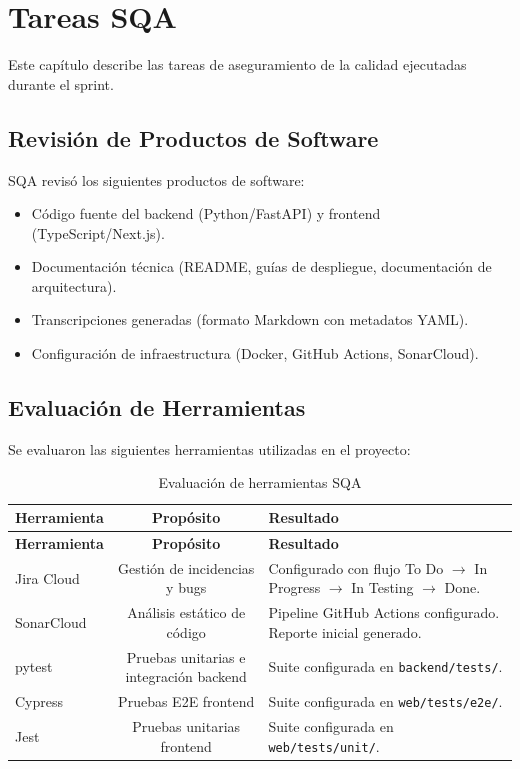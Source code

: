 \chapter{Tareas SQA}
\label{sec:tareas}

Este capítulo describe las tareas de aseguramiento de la calidad ejecutadas durante el sprint.

\section{Revisión de Productos de Software}
\label{sec:revision-productos}

SQA revisó los siguientes productos de software:

\begin{itemize}
    \item Código fuente del backend (Python/FastAPI) y frontend (TypeScript/Next.js).
    \item Documentación técnica (README, guías de despliegue, documentación de arquitectura).
    \item Transcripciones generadas (formato Markdown con metadatos YAML).
    \item Configuración de infraestructura (Docker, GitHub Actions, SonarCloud).
\end{itemize}

\section{Evaluación de Herramientas}
\label{sec:evaluacion-herramientas}

Se evaluaron las siguientes herramientas utilizadas en el proyecto:

\begin{longtable}{lcp{7cm}}
\caption{Evaluación de herramientas SQA}
\label{tab:herramientas-evaluadas}\\
\toprule
\textbf{Herramienta} & \textbf{Propósito} & \textbf{Resultado}\\
\midrule
\endfirsthead
\toprule
\textbf{Herramienta} & \textbf{Propósito} & \textbf{Resultado}\\
\midrule
\endhead
\bottomrule
\endfoot

Jira Cloud & Gestión de incidencias y bugs & Configurado con flujo To Do $\rightarrow$ In Progress $\rightarrow$ In Testing $\rightarrow$ Done.\\

SonarCloud & Análisis estático de código & Pipeline GitHub Actions configurado. Reporte inicial generado.\\

pytest & Pruebas unitarias e integración backend & Suite configurada en \texttt{backend/tests/}.\\

Cypress & Pruebas E2E frontend & Suite configurada en \texttt{web/tests/e2e/}.\\

Jest & Pruebas unitarias frontend & Suite configurada en \texttt{web/tests/unit/}.\\

\end{longtable}

